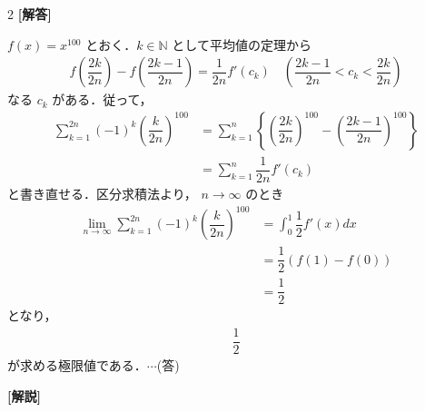 \documentclass[../../main.tex]{subfiles}
\begin{document}
\setcounter{equation}{0}
\begin{oframed}
  
\end{oframed}
\setlength{\columnseprule}{0.4pt}
\begin{multicols}{2}
  {\bf [解答]}

  $f(x) = x^{100}$ とおく．$k \in \mathbb{N}$ として平均値の定理から
  \begin{align}
    f\left(\dfrac{2k}{2n}\right) - f\left(\dfrac{2k-1}{2n}\right)
    = \dfrac{1}{2n} f'(c_k) \quad \left(\dfrac{2k-1}{2n} < c_k < \dfrac{2k}{2n}\right)
  \end{align}
  なる $c_k$ がある．従って，
  \begin{align}
    \sum_{k=1}^{2n} (-1)^k \left(\dfrac{k}{2n}\right)^{100}
    & = \sum_{k=1}^{n} \left\{ \left(\dfrac{2k}{2n}\right)^{100} - \left(\dfrac{2k-1}{2n}\right)^{100} \right\} \\
    & = \sum_{k=1}^{n} \dfrac{1}{2n} f'(c_k)
  \end{align}
  と書き直せる．区分求積法より，
  $n \to \infty$ のとき
  \begin{align}
    \lim_{n\to\infty} \sum_{k=1}^{2n} (-1)^k \left(\dfrac{k}{2n}\right)^{100}
    & = \int_0^1 \dfrac{1}{2} f'(x) dx \\
    & = \dfrac{1}{2} (f(1) - f(0))     \\
    & = \dfrac{1}{2}
  \end{align}
  となり，
  \begin{align}
    \dfrac{1}{2}
  \end{align}
  が求める極限値である．$\cdots$(答)

  {\bf [解説]}

  \newpage
\end{multicols}
\end{document}
